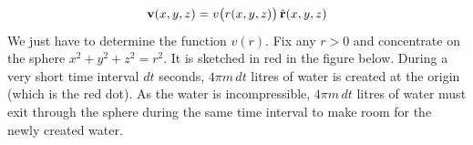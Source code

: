 \begin{eg}
\begin{equation*}
\mathbf{v}(x,y,z) = v\big(r(x,y,z)\big)\,\hat{\mathbf{r}}(x,y,z)
\end{equation*}
We just have to determine the function $v(r)$. Fix any $r>0$ and
concentrate on the sphere $x^2+y^2+z^2=r^2$. It is sketched in red
in the figure below.
During a very short time interval $dt$ seconds, $4\pi m\,dt$ litres
of water is created at the origin (which is the red dot). As the water 
is incompressible, $4\pi m\,dt$ litres of water must exit through 
the sphere during the same time interval to make room for the newly 
created water. 


\end{eg}
